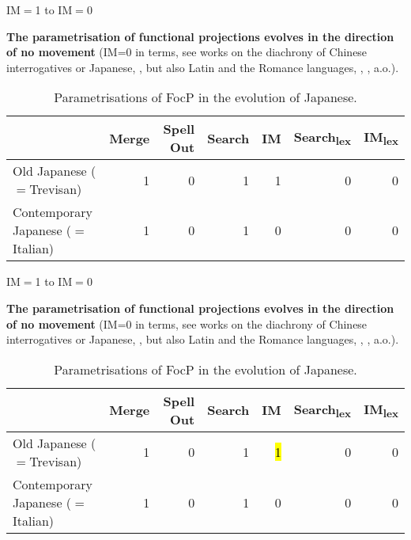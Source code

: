 \documentclass[lesson_slides]{subfiles}
\begin{document}
\begin{frame}[c]{IM$=$1 to IM$=$0}

    \textbf{The parametrisation of functional projections evolves in the direction of no movement} (IM=0 in \cite{rizzi2017} terms, see works on the diachrony of Chinese interrogatives \cite{aldridge2010clause} or Japanese, \cite{aldridge2009old}, but also Latin and the Romance languages, \cite{roberts2003syntactic}, \cite{dadan2019}, a.o.). \pause
    
    \begin{table}[ht]
        \centering
        \begin{tabular}{|l|r|r|r|r|r|r|}
        \hline
         & Merge & Spell Out & Search & IM & Search\textsubscript{lex} & IM\textsubscript{lex} \\
        \hline
        Old Japanese ($=$Trevisan) & 1 & 0 & 1 & 1 & 0 & 0\\
        \hline
        Contemporary Japanese ($=$Italian) & 1 & 0 & 1 & 0 & 0 & 0 \\
        \hline
        \end{tabular}
        \caption{\label{tab:samp2}Parametrisations of FocP in the evolution of Japanese.}
    \end{table}
    
\end{frame}
\begin{frame}[c]{IM$=$1 to IM$=$0}

\textbf{The parametrisation of functional projections evolves in the direction of no movement} (IM=0 in \cite{rizzi2017} terms, see works on the diachrony of Chinese interrogatives \cite{aldridge2010clause} or Japanese, \cite{aldridge2009old}, but also Latin and the Romance languages, \cite{roberts2003syntactic}, \cite{dadan2019}, a.o.).

\begin{table}[ht]
    \centering
    \begin{tabular}{|l|r|r|r|r|r|r|}
    \hline
     & Merge & Spell Out & Search & IM & Search\textsubscript{lex} & IM\textsubscript{lex} \\
    \hline
    Old Japanese ($=$Trevisan) & 1 & 0 & 1 & \hl{1} & 0 & 0\\
    \hline
    Contemporary Japanese ($=$Italian) & 1 & 0 & 1 & 0 & 0 & 0 \\
    \hline
    \end{tabular}
    \caption{\label{tab:samp2}Parametrisations of FocP in the evolution of Japanese.}
    \end{table}

\end{frame}
\end{document}
